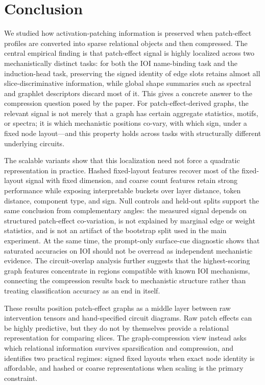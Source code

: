 \documentclass[11pt,a4paper]{article}
\begin{document}
\section{Conclusion}

We studied how activation-patching information is preserved when patch-effect profiles are converted into sparse relational objects and then compressed. The central empirical finding is that patch-effect signal is highly localized across two mechanistically distinct tasks: for both the IOI name-binding task and the induction-head task, preserving the signed identity of edge slots retains almost all slice-discriminative information, while global shape summaries such as spectral and graphlet descriptors discard most of it. This gives a concrete answer to the compression question posed by the paper. For patch-effect-derived graphs, the relevant signal is not merely that a graph has certain aggregate statistics, motifs, or spectra; it is which mechanistic positions co-vary, with which sign, under a fixed node layout---and this property holds across tasks with structurally different underlying circuits.

The scalable variants show that this localization need not force a quadratic representation in practice. Hashed fixed-layout features recover most of the fixed-layout signal with fixed dimension, and coarse count features retain strong performance while exposing interpretable buckets over layer distance, token distance, component type, and sign. Null controls and held-out splits support the same conclusion from complementary angles: the measured signal depends on structured patch-effect co-variation, is not explained by marginal edge or weight statistics, and is not an artifact of the bootstrap split used in the main experiment. At the same time, the prompt-only surface-cue diagnostic shows that saturated accuracies on IOI should not be overread as independent mechanistic evidence. The circuit-overlap analysis further suggests that the highest-scoring graph features concentrate in regions compatible with known IOI mechanisms, connecting the compression results back to mechanistic structure rather than treating classification accuracy as an end in itself.

These results position patch-effect graphs as a middle layer between raw intervention tensors and hand-specified circuit diagrams. Raw patch effects can be highly predictive, but they do not by themselves provide a relational representation for comparing slices. The graph-compression view instead asks which relational information survives sparsification and compression, and identifies two practical regimes: signed fixed layouts when exact node identity is affordable, and hashed or coarse representations when scaling is the primary constraint.
\end{document}
